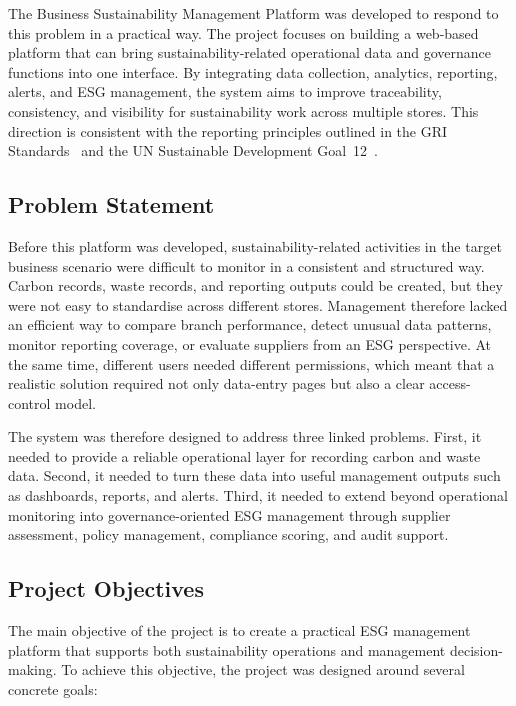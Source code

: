 \documentclass[11pt,a4paper]{article}
\begin{document}
The Business Sustainability Management Platform was developed to respond to this problem in a practical way. The project focuses on building a web-based platform that can bring sustainability-related operational data and governance functions into one interface. By integrating data collection, analytics, reporting, alerts, and ESG management, the system aims to improve traceability, consistency, and visibility for sustainability work across multiple stores. This direction is consistent with the reporting principles outlined in the GRI Standards~\cite{gri2021} and the UN Sustainable Development Goal~12~\cite{un_sdg12}.

\subsection{Problem Statement}
Before this platform was developed, sustainability-related activities in the target business scenario were difficult to monitor in a consistent and structured way. Carbon records, waste records, and reporting outputs could be created, but they were not easy to standardise across different stores. Management therefore lacked an efficient way to compare branch performance, detect unusual data patterns, monitor reporting coverage, or evaluate suppliers from an ESG perspective. At the same time, different users needed different permissions, which meant that a realistic solution required not only data-entry pages but also a clear access-control model.

The system was therefore designed to address three linked problems. First, it needed to provide a reliable operational layer for recording carbon and waste data. Second, it needed to turn these data into useful management outputs such as dashboards, reports, and alerts. Third, it needed to extend beyond operational monitoring into governance-oriented ESG management through supplier assessment, policy management, compliance scoring, and audit support.

\subsection{Project Objectives}
The main objective of the project is to create a practical ESG management platform that supports both sustainability operations and management decision-making. To achieve this objective, the project was designed around several concrete goals:
\end{document}
